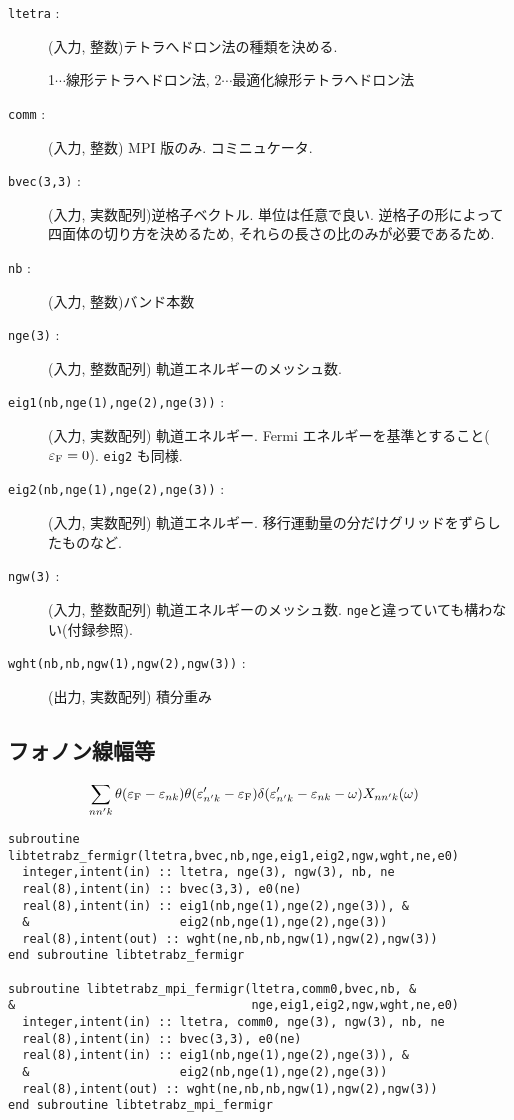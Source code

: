 \documentclass[12pt]{jarticle}
\begin{document}
\begin{description}
\item[\texttt{ltetra} : ] (入力, 整数)テトラへドロン法の種類を決める. 
  
  1$\cdots$線形テトラへドロン法,  
  2$\cdots$最適化線形テトラへドロン法
\item[\texttt{comm} : ] (入力, 整数) MPI 版のみ. コミニュケータ. 
\item[\texttt{bvec(3,3)} : ] (入力, 実数配列)逆格子ベクトル. 単位は任意で良い. 
  逆格子の形によって四面体の切り方を決めるため, それらの長さの比のみが必要であるため. 
\item[\texttt{nb} : ] (入力, 整数)バンド本数
\item[\texttt{nge(3)} : ] (入力, 整数配列) 軌道エネルギーのメッシュ数. 
\item[\texttt{eig1(nb,nge(1),nge(2),nge(3))} : ] (入力, 実数配列) 軌道エネルギー. 
  Fermi エネルギーを基準とすること($\varepsilon_{\rm F}=0$). \verb|eig2| も同様. 
\item[\texttt{eig2(nb,nge(1),nge(2),nge(3))} : ] (入力, 実数配列) 軌道エネルギー. 
  移行運動量の分だけグリッドをずらしたものなど. 
\item[\texttt{ngw(3)} : ] (入力, 整数配列) 軌道エネルギーのメッシュ数. 
\verb|nge|と違っていても構わない(付録参照). 
\item[\texttt{wght(nb,nb,ngw(1),ngw(2),ngw(3))} : ] (出力, 実数配列) 積分重み
\end{description}

\newpage

\subsection{フォノン線幅等}

\begin{align}
&\sum_{n n' k} \theta(\varepsilon_{\rm F} - \varepsilon_{n k})
\theta(\varepsilon'_{n' k} - \varepsilon_{\rm F})
\delta(\varepsilon'_{n' k} - \varepsilon_{n k} - \omega) X_{n n' k}(\omega)
\end{align}

\begin{verbatim}
subroutine libtetrabz_fermigr(ltetra,bvec,nb,nge,eig1,eig2,ngw,wght,ne,e0)
  integer,intent(in) :: ltetra, nge(3), ngw(3), nb, ne
  real(8),intent(in) :: bvec(3,3), e0(ne)
  real(8),intent(in) :: eig1(nb,nge(1),nge(2),nge(3)), &
  &                     eig2(nb,nge(1),nge(2),nge(3))
  real(8),intent(out) :: wght(ne,nb,nb,ngw(1),ngw(2),ngw(3))
end subroutine libtetrabz_fermigr

subroutine libtetrabz_mpi_fermigr(ltetra,comm0,bvec,nb, &
&                                 nge,eig1,eig2,ngw,wght,ne,e0)
  integer,intent(in) :: ltetra, comm0, nge(3), ngw(3), nb, ne
  real(8),intent(in) :: bvec(3,3), e0(ne)
  real(8),intent(in) :: eig1(nb,nge(1),nge(2),nge(3)), &
  &                     eig2(nb,nge(1),nge(2),nge(3))
  real(8),intent(out) :: wght(ne,nb,nb,ngw(1),ngw(2),ngw(3))
end subroutine libtetrabz_mpi_fermigr
\end{verbatim}
\end{document}
